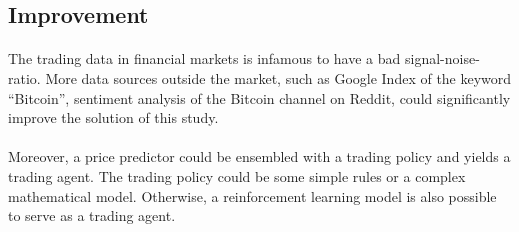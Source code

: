 \documentclass[12pt, letterpaper]{article}
\begin{document}
\subsection{Improvement}

\paragraph{}
The trading data in financial markets is infamous to have a bad signal-noise-ratio. More data sources outside the market, such as Google Index of the keyword ``Bitcoin'', sentiment analysis of the Bitcoin channel on Reddit, could significantly improve the solution of this study.

\paragraph{}
Moreover, a price predictor could be ensembled with a trading policy and yields a trading agent. The trading policy could be some simple rules or a complex mathematical model. Otherwise, a reinforcement learning model is also possible to serve as a trading agent.
\end{document}
